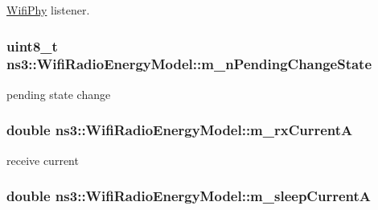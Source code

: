 \hyperlink{classns3_1_1WifiPhy}{Wifi\+Phy} listener. 

\subsubsection[{\texorpdfstring{m\+\_\+n\+Pending\+Change\+State}{m_nPendingChangeState}}]{\setlength{\rightskip}{0pt plus 5cm}uint8\+\_\+t ns3\+::\+Wifi\+Radio\+Energy\+Model\+::m\+\_\+n\+Pending\+Change\+State\hspace{0.3cm}{\ttfamily [private]}}\hypertarget{classns3_1_1WifiRadioEnergyModel_afbe1f543be97f42adf5ef9cefb36bd58}{}\label{classns3_1_1WifiRadioEnergyModel_afbe1f543be97f42adf5ef9cefb36bd58}


pending state change 

\subsubsection[{\texorpdfstring{m\+\_\+rx\+CurrentA}{m_rxCurrentA}}]{\setlength{\rightskip}{0pt plus 5cm}double ns3\+::\+Wifi\+Radio\+Energy\+Model\+::m\+\_\+rx\+CurrentA\hspace{0.3cm}{\ttfamily [private]}}\hypertarget{classns3_1_1WifiRadioEnergyModel_ac96a97fe3fd0c6b69cdcc976de440c43}{}\label{classns3_1_1WifiRadioEnergyModel_ac96a97fe3fd0c6b69cdcc976de440c43}


receive current 

\subsubsection[{\texorpdfstring{m\+\_\+sleep\+CurrentA}{m_sleepCurrentA}}]{\setlength{\rightskip}{0pt plus 5cm}double ns3\+::\+Wifi\+Radio\+Energy\+Model\+::m\+\_\+sleep\+CurrentA\hspace{0.3cm}{\ttfamily [private]}}\hypertarget{classns3_1_1WifiRadioEnergyModel_a42b305809982bb48a4c6ff3ca20614a4}{}\label{classns3_1_1WifiRadioEnergyModel_a42b305809982bb48a4c6ff3ca20614a4}


